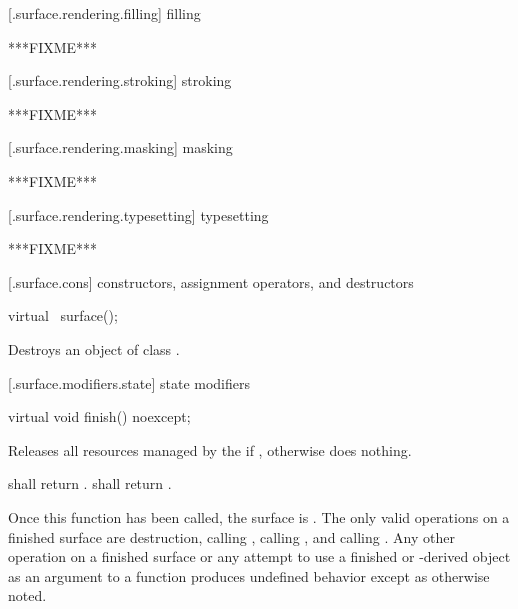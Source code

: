  [\iotwod.surface.rendering.filling] { filling}

\pnum
***FIXME***

 [\iotwod.surface.rendering.stroking] { stroking}

\pnum
***FIXME***

 [\iotwod.surface.rendering.masking] { masking}

\pnum
***FIXME***

 [\iotwod.surface.rendering.typesetting] { typesetting}

\pnum
***FIXME***



 [\iotwod.surface.cons] { constructors, assignment operators, and destructors}

\begin{itemdecl}
virtual ~surface();
\end{itemdecl}
\begin{itemdescr}
\pnum
\effects
Destroys an object of class .
\end{itemdescr}

 [\iotwod.surface.modifiers.state] { state modifiers}

\begin{itemdecl}
virtual void finish() noexcept;
\end{itemdecl}
\begin{itemdescr}
\pnum
\effects
Releases all resources managed by the  if , otherwise does nothing.

\pnum
\postconditions
{} shall return .  shall return .

\pnum
\remarks
Once this function has been called, the surface is . The only valid operations on a finished surface are destruction, calling , calling , and calling . Any other operation on a finished surface or any attempt to use a finished  or -derived object as an argument to a function produces undefined behavior except as otherwise noted.
\end{itemdescr}

